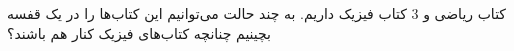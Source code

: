 کتاب ریاضی و 3 کتاب فیزیک داریم. به چند حالت می‌توانیم این کتاب‌ها را در یک قفسه بچینیم چنانچه کتاب‌های فیزیک کنار هم باشند؟ 

